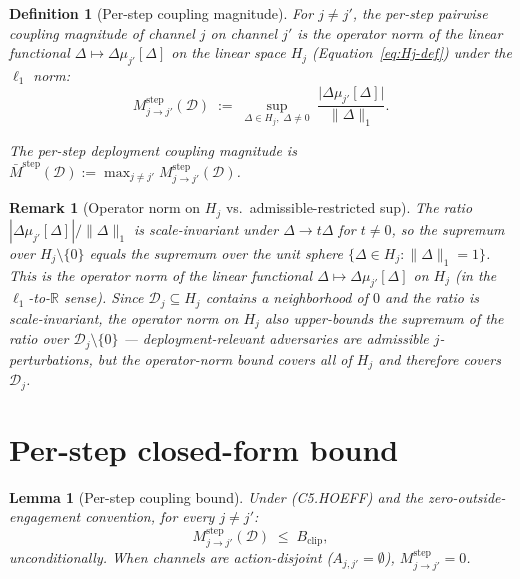 \documentclass{article}
\newtheorem{definition}{Definition}
\newtheorem{lemma}{Lemma}
\newtheorem{remark}{Remark}
\newcommand{\Bclip}{B_{\mathrm{clip}}}
\begin{document}
\begin{definition}[Per-step coupling magnitude]
\label{def:M-step-v3}
For $j \neq j'$, the \emph{per-step pairwise coupling magnitude}
of channel $j$ on channel $j'$ is the operator norm of the linear
functional $\Delta \mapsto \Delta\mu_{j'}[\Delta]$ on the linear
space $H_j$ (Equation~\eqref{eq:Hj-def}) under the $\ell_1$ norm:
\begin{equation}
\label{eq:M-step-def-v3}
  M_{j \to j'}^{\mathrm{step}}(\mathcal{D})
  \;:=\; \sup_{\Delta \in H_j,\; \Delta \neq 0}
  \;\frac{\big| \Delta\mu_{j'}[\Delta] \big|}{\|\Delta\|_1}.
\end{equation}

The \emph{per-step deployment coupling magnitude} is
$\bar{M}^{\mathrm{step}}(\mathcal{D}) := \max_{j \neq j'}
M_{j \to j'}^{\mathrm{step}}(\mathcal{D})$.
\end{definition}

\begin{remark}[Operator norm on $H_j$ vs.\ admissible-restricted sup]
\label{rem:operator-norm}
The ratio $|\Delta\mu_{j'}[\Delta]| / \|\Delta\|_1$ is scale-invariant
under $\Delta \to t\Delta$ for $t \neq 0$, so the supremum over
$H_j \setminus \{0\}$ equals the supremum over the unit sphere
$\{\Delta \in H_j : \|\Delta\|_1 = 1\}$.  This is the operator
norm of the linear functional $\Delta \mapsto \Delta\mu_{j'}[\Delta]$
on $H_j$ (in the $\ell_1$-to-$\mathbb{R}$ sense).  Since
$\mathcal{D}_j \subseteq H_j$ contains a neighborhood of $0$ and
the ratio is scale-invariant, the operator norm on $H_j$ also
upper-bounds the supremum of the ratio over $\mathcal{D}_j
\setminus \{0\}$ ---
deployment-relevant adversaries are admissible
$j$-perturbations, but the operator-norm bound covers all of
$H_j$ and therefore covers $\mathcal{D}_j$.
\end{remark}

\section{Per-step closed-form bound}

\begin{lemma}[Per-step coupling bound]
\label{lem:per-step-v3}
Under (C5.HOEFF) and the zero-outside-engagement convention, for
every $j \neq j'$:
\begin{equation}
\label{eq:per-step-bound-v3}
  M_{j \to j'}^{\mathrm{step}}(\mathcal{D}) \;\leq\; \Bclip,
\end{equation}
unconditionally.  When channels are action-disjoint
($A_{j, j'} = \emptyset$), $M_{j \to j'}^{\mathrm{step}} = 0$.
\end{lemma}
\end{document}
